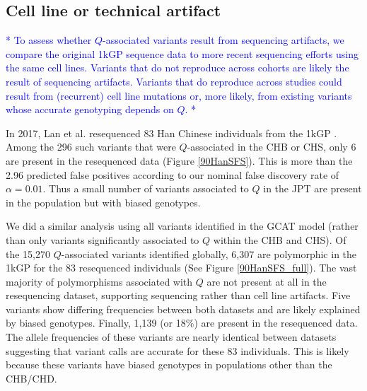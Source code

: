 \documentclass[9pt,lineno]{template}
\newcommand{\todo}[1]{\textcolor{blue}{*#1*}}
\begin{document}
\subsection{Cell line or technical artifact}
\todo{
To assess whether $Q$-associated variants result from sequencing artifacts, we compare the original 1kGP sequence data to more recent sequencing efforts using the same cell lines.
Variants that do not reproduce across cohorts are likely the result of sequencing artifacts. 
Variants that do reproduce across studies could result from (recurrent) cell line mutations or, more likely, from existing variants whose accurate genotyping depends on $Q$.   
}

In 2017, Lan et al. resequenced 83 Han Chinese individuals from the 1kGP \citep{Lan2017}. 
Among the 296 such variants that were $Q$-associated in the CHB or CHS, only 6 are present in the resequenced data (Figure \ref{90HanSFS}). 
This is more than the 2.96 predicted false positives according to our nominal false discovery rate of $\alpha = 0.01$. 
Thus a small number of variants associated to $Q$ in the JPT are present in the population but with biased genotypes. 

We did a similar analysis using all variants identified in the GCAT model (rather than only variants significantly associated to $Q$ within the CHB and CHS). 
Of the 15,270 $Q$-associated variants identified globally, 6,307 are polymorphic in the 1kGP for the 83 resequenced individuals  (See Figure \ref{90HanSFS_full}).
The vast majority of polymorphisms associated with $Q$ are not present at all in the resequencing dataset, supporting sequencing rather than cell line artifacts.
Five variants show differing frequencies between both datasets and are likely explained by biased genotypes.
Finally, 1,139 (or 18\%) are present in the resequenced data.
The allele frequencies of these variants are nearly identical between datasets suggesting that variant calls are accurate for these 83 individuals. This is likely because these variants have biased genotypes in populations other than the CHB/CHD. 

\end{document}
